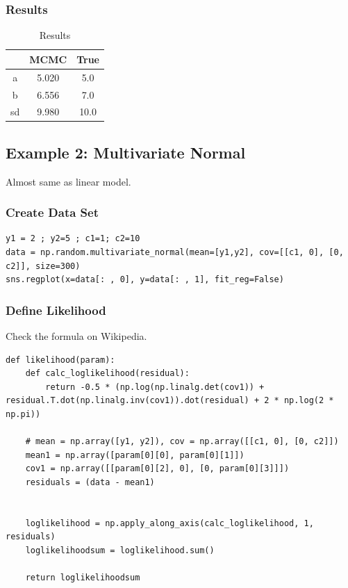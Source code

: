 \documentclass[a4paper,10.5pt,uplatex]{jsarticle}  %
\begin{document}
\subsubsection{Results}
\begin{table}[H]
\centering
\caption{Results}
\label{my-label}
\begin{tabular}{|c|c|c|}
\hline
   & MCMC  & True \\ \hline
a  & 5.020 & 5.0  \\ \hline
b  & 6.556 & 7.0  \\ \hline
sd & 9.980 & 10.0 \\ \hline
\end{tabular}
\end{table}

\subsection{Example 2: Multivariate Normal}
Almost same as linear model.

\subsubsection{Create Data Set}
\begin{lstlisting}
y1 = 2 ; y2=5 ; c1=1; c2=10
data = np.random.multivariate_normal(mean=[y1,y2], cov=[[c1, 0], [0, c2]], size=300)
sns.regplot(x=data[: , 0], y=data[: , 1], fit_reg=False)
\end{lstlisting}

\subsubsection{Define Likelihood}
Check the formula on Wikipedia.
\begin{lstlisting}
def likelihood(param): 
    def calc_loglikelihood(residual):
        return -0.5 * (np.log(np.linalg.det(cov1)) + residual.T.dot(np.linalg.inv(cov1)).dot(residual) + 2 * np.log(2 * np.pi))
    
    # mean = np.array([y1, y2]), cov = np.array([[c1, 0], [0, c2]])
    mean1 = np.array([param[0][0], param[0][1]])
    cov1 = np.array([[param[0][2], 0], [0, param[0][3]]])
    residuals = (data - mean1)


    loglikelihood = np.apply_along_axis(calc_loglikelihood, 1, residuals)
    loglikelihoodsum = loglikelihood.sum()

    return loglikelihoodsum
\end{lstlisting}
\end{document}

